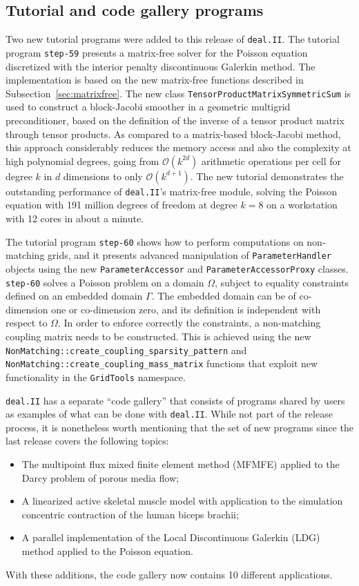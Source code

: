 \documentclass{ansarticle-preprint}
\newcommand{\specialword}[1]{\texttt{#1}}
\newcommand{\dealii}{{\specialword{deal.II}}\xspace}
\begin{document}
\subsection{Tutorial and code gallery programs}

Two new tutorial programs were added to this release of \dealii{}. The
tutorial program \texttt{step-59} presents a matrix-free solver for the
Poisson equation discretized with the interior penalty discontinuous Galerkin
method. The implementation is based on the new matrix-free functions described
in Subsection~\ref{sec:matrixfree}. The new class
\texttt{TensorProductMatrixSymmetricSum} is used to construct a block-Jacobi
smoother in a geometric multigrid preconditioner, based on the definition of
the inverse of a tensor product matrix through tensor products. As compared to
a matrix-based block-Jacobi method, this approach considerably reduces the
memory access and also the complexity at high polynomial degrees, going from
$\mathcal O(k^{2d})$ arithmetic operations per cell for degree $k$ in $d$
dimensions to only $\mathcal O(k^{d+1})$. The new tutorial demonstrates the
outstanding performance of \dealii{}'s matrix-free module, solving the Poisson
equation with 191 million degrees of freedom at degree $k=8$ on a workstation
with 12 cores in about a minute.

The tutorial program \texttt{step-60} shows how to perform computations on
non-matching grids, and it presents advanced manipulation of
\texttt{ParameterHandler} objects using the new \texttt{ParameterAccessor}
and \texttt{ParameterAccessorProxy} classes. \texttt{step-60} solves a Poisson
problem on a domain $\Omega$, subject to equality constraints defined on an
embedded domain $\Gamma$. The embedded domain can be of co-dimension one or
co-dimension zero, and its definition is independent with respect to $\Omega$.
In order to enforce correctly the constraints, a non-matching coupling matrix
needs to be constructed. This is achieved using the new
\texttt{NonMatching::create\_coupling\_sparsity\_pattern} and
\texttt{NonMatching::create\_coupling\_mass\_matrix} functions that exploit new
functionality in the \texttt{GridTools} namespace.

\dealii has a separate ``code gallery'' that
consists of programs shared by users as examples of what can be
done with \dealii. While not part of the release process, it is nonetheless
worth mentioning that the set of new programs since the last release covers
the following topics:
\begin{itemize}
\item The multipoint flux mixed finite element method (MFMFE) applied
  to the Darcy problem of porous media flow;
\item A linearized active skeletal muscle model with application to
  the simulation concentric contraction of the human biceps brachii;
\item A parallel implementation of the Local Discontinuous Galerkin
  (LDG) method applied to the Poisson equation.
\end{itemize}
With these additions, the code gallery now contains 10 different applications.
\end{document}
